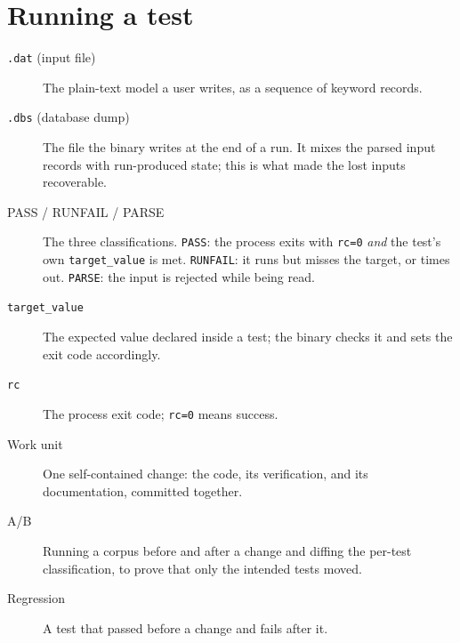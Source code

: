 \documentclass[11pt,a4paper]{report}
\newcommand{\code}[1]{\texttt{#1}}
\begin{document}
\section*{Running a test}
\begin{description}
  \item[\code{.dat} (input file)] The plain-text model a user writes, as a
        sequence of keyword records.
  \item[\code{.dbs} (database dump)] The file the binary writes at the end of a
        run. It mixes the parsed input records with run-produced state; this is
        what made the lost inputs recoverable.
  \item[PASS / RUNFAIL / PARSE] The three classifications. \code{PASS}: the
        process exits with \code{rc=0} \emph{and} the test's own
        \code{target\_\allowbreak value} is met. \code{RUNFAIL}: it runs but misses
        the target, or times out. \code{PARSE}: the input is rejected while
        being read.
  \item[\code{target\_\allowbreak value}] The expected value declared inside a test;
        the binary checks it and sets the exit code accordingly.
  \item[\code{rc}] The process exit code; \code{rc=0} means success.
  \item[Work unit] One self-contained change: the code, its verification, and
        its documentation, committed together.
  \item[A/B] Running a corpus before and after a change and diffing the
        per-test classification, to prove that only the intended tests moved.
  \item[Regression] A test that passed before a change and fails after it.
\end{description}
\end{document}

